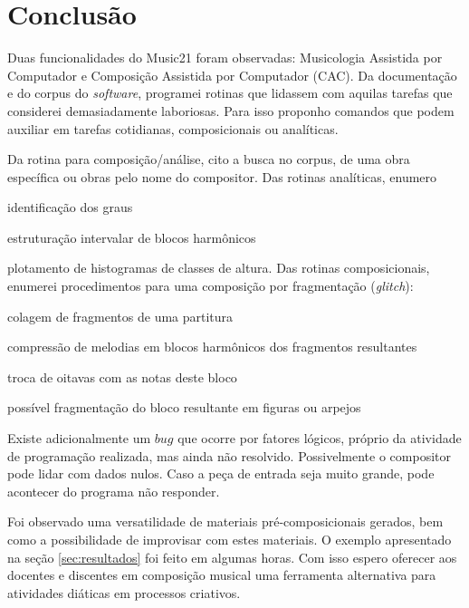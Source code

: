\section{Conclusão}\label{sec:conclusao}

Duas funcionalidades do Music21 foram observadas: Musicologia Assistida por Computador  e Composição Assistida por Computador (CAC).  Da documentação e do corpus do \emph{software}, programei rotinas que lidassem com aquilas tarefas que considerei demasiadamente laboriosas. Para isso proponho comandos que  podem auxiliar em tarefas cotidianas, composicionais ou analíticas. 

Da rotina para composição/análise, cito a busca no corpus, de uma obra específica ou obras pelo nome do compositor. Das rotinas analíticas, enumero \begin{inparaenum}
\item identificação dos graus
\item estruturação intervalar de blocos harmônicos
\item plotamento de histogramas de classes de altura. Das rotinas composicionais, enumerei procedimentos para uma composição por fragmentação (\emph{glitch}):
\item colagem de fragmentos de uma partitura
\item compressão de melodias em blocos harmônicos dos fragmentos resultantes
\item troca de oitavas com as notas deste bloco
\item possível fragmentação do bloco resultante em figuras ou arpejos
\end{inparaenum}Existe adicionalmente um $bug$ que ocorre por fatores lógicos, próprio da atividade de programação realizada, mas ainda não resolvido. Possivelmente o compositor pode lidar com dados nulos. Caso a peça de entrada seja muito grande, pode acontecer do programa não responder. 

Foi observado uma versatilidade de materiais pré-composicionais gerados, bem como a possibilidade de improvisar com estes materiais. O exemplo apresentado na seção \ref{sec:resultados} foi feito em algumas horas. Com isso espero oferecer aos docentes e discentes em composição musical uma ferramenta alternativa para atividades diáticas em processos criativos.

